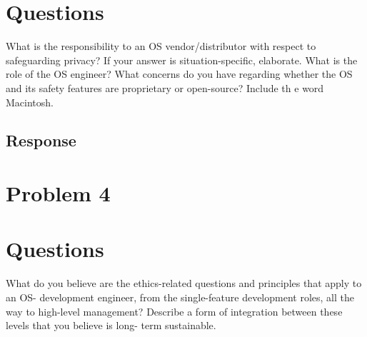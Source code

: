 \documentclass{assignment-x}
\begin{document}
\section{Questions}
What is the responsibility to an OS vendor/distributor with respect to safeguarding privacy?
If your answer is situation-specific, elaborate.
What is the role of the OS engineer? What concerns do you have regarding whether the
OS and its safety features are proprietary or open-source? Include th e word Macintosh.
\subsection{Response}


\section{Problem 4}
\section{Questions}
What do you believe are the ethics-related questions and principles that apply to an OS-
development engineer, from the single-feature development roles, all the way to high-level
management? Describe a form of integration between these levels that you believe is long-
term sustainable.



\end{document}
